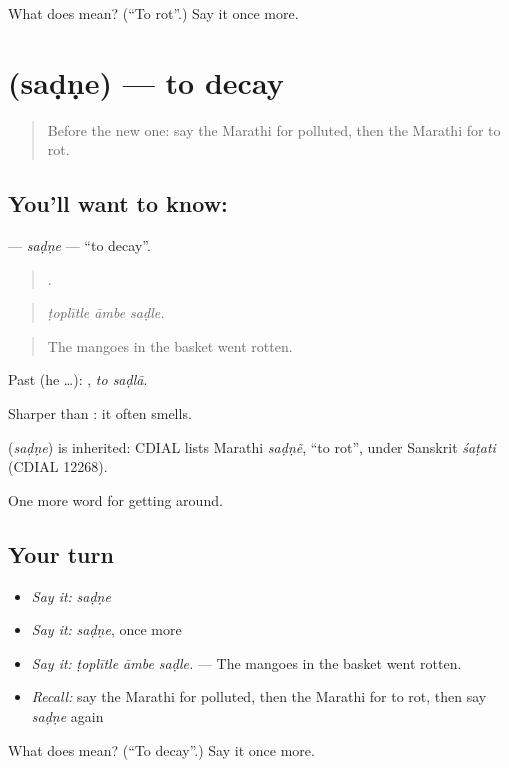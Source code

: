 \begin{tcolorbox}[breakable,colback=teal!4,colframe=teal!35!black,title={Before you move on}]
What does  mean? (\textquotedblleft{}To rot\textquotedblright{}.) Say it once more.
\end{tcolorbox}
\section[\texorpdfstring{\mr{सडणे} (saḍṇe)}{सडणे (saḍṇe)}]{ (saḍṇe) — to decay}

\label{lesson:MR-C448-sadne}



\begin{quote}
Before the new one: say the Marathi for polluted, then the Marathi for to rot.
\end{quote}

\subsection*{You'll want to know: }
\textbf{} — \emph{saḍṇe} — \textquotedblleft{}to decay\textquotedblright{}.

\begin{quote}
  .
\end{quote}

\begin{quote}
\emph{ṭoplītle āmbe saḍle.}
\end{quote}

\begin{quote}
The mangoes in the basket went rotten.
\end{quote}

Past (he …):  , \emph{to saḍlā}.

Sharper than : it often smells.

\begin{cousinweb}
\textbf{} (\emph{saḍṇe}) is inherited: CDIAL lists Marathi \emph{saḍṇẽ}, \textquotedblleft{}to rot\textquotedblright{}, under Sanskrit \emph{śaṭati} (CDIAL 12268).
\end{cousinweb}

\begin{grammarlens}[title={What you've built}]
One more word for getting around.
\end{grammarlens}

\subsection*{Your turn}
\begin{itemize}
\raggedright
  \item \emph{Say it:} \emph{saḍṇe}
  \item \emph{Say it:} \emph{saḍṇe}, once more
  \item \emph{Say it:} \emph{ṭoplītle āmbe saḍle.} — The mangoes in the basket went rotten.
  \item \emph{Recall:} say the Marathi for polluted, then the Marathi for to rot, then say \emph{saḍṇe} again
\end{itemize}

\begin{tcolorbox}[breakable,colback=teal!4,colframe=teal!35!black,title={Before you move on}]
What does  mean? (\textquotedblleft{}To decay\textquotedblright{}.) Say it once more.
\end{tcolorbox}
